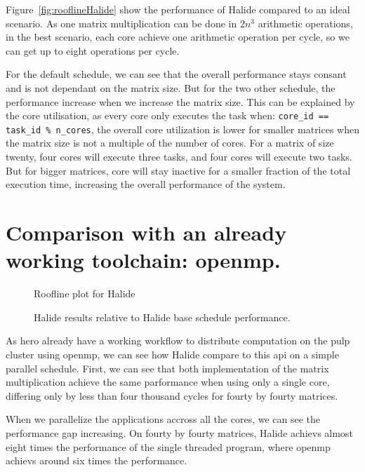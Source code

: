 	Figure~\ref{fig:rooflineHalide} show the performance of Halide compared to an ideal scenario. As one matrix multiplication can be done in $2n^3$ arithmetic operations, in the best scenario, each core achieve one arithmetic operation per cycle, so we can get up to eight operations per cycle.

	For the default schedule, we can see that the overall performance stays consant and is not dependant on the matrix size. 
	But for the two other schedule, the performance increase when we increase the matrix size.
	This can be explained by the core utilisation, as every core only executes the task when: \texttt{core\_id == task\_id \% n\_cores}, the overall core utilization is lower for smaller matrices when the matrix size is not a multiple of the number of cores.
	For a matrix of size twenty, four cores will execute three tasks, and four cores will execute two tasks.
	But for bigger matrices, core will stay inactive for a smaller fraction of the total execution time, increasing the overall performance of the  system.
 

\section{Comparison with an already working toolchain: \acrshort{openmp}.}

\begin{figure}[H]
		\center
	\scalebox{.6}{}
    \caption{Roofline plot for Halide}
	\label{fig:rooflineHalideOpenMP}
\end{figure}
\begin{figure}[H]
		\center
		\scalebox{.6}{}
    \caption{Halide results relative to Halide base schedule performance.}
	\label{fig:barPlotHalideOpenMP}
\end{figure}



As \gls{hero} already have a working workflow to distribute computation on the \gls{pulp} cluster using \gls{openmp}, we can see how Halide compare to this \gls{api} on a simple  parallel schedule.
	First, we can see that both implementation of the matrix multiplication achieve the same parformance when using only a single core, differing only by less than four thousand cycles for fourty by fourty matrices.

	When we parallelize the applications accross all the cores, we can see the  performance gap increasing. On fourty by fourty matrices, Halide achievs almost eight times the performance of the single threaded program, where \gls{openmp} achievs around six times the performance.

